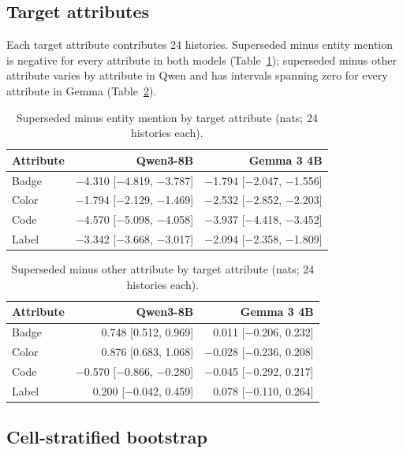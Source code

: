\subsection{Target attributes}

Each target attribute contributes 24 histories. Superseded minus entity mention is negative for every attribute in both models (Table~\ref{tab:b-attr-entity}); superseded minus other attribute varies by attribute in Qwen and has intervals spanning zero for every attribute in Gemma (Table~\ref{tab:b-attr-other}).

\begin{table}[h]
\caption{Superseded minus entity mention by target attribute (nats; 24 histories each).}
\label{tab:b-attr-entity}
\begin{center}
\small
\begin{tabular}{@{}lrr@{}}
\toprule
Attribute & Qwen3-8B & Gemma 3 4B \\
\midrule
Badge & −4.310 [−4.819, −3.787] & −1.794 [−2.047, −1.556] \\
Color & −1.794 [−2.129, −1.469] & −2.532 [−2.852, −2.203] \\
Code & −4.570 [−5.098, −4.058] & −3.937 [−4.418, −3.452] \\
Label & −3.342 [−3.668, −3.017] & −2.094 [−2.358, −1.809] \\
\bottomrule
\end{tabular}
\end{center}
\end{table}

\begin{table}[h]
\caption{Superseded minus other attribute by target attribute (nats; 24 histories each).}
\label{tab:b-attr-other}
\begin{center}
\small
\begin{tabular}{@{}lrr@{}}
\toprule
Attribute & Qwen3-8B & Gemma 3 4B \\
\midrule
Badge & 0.748 [0.512, 0.969] & 0.011 [−0.206, 0.232] \\
Color & 0.876 [0.683, 1.068] & −0.028 [−0.236, 0.208] \\
Code & −0.570 [−0.866, −0.280] & −0.045 [−0.292, 0.217] \\
Label & 0.200 [−0.042, 0.459] & 0.078 [−0.110, 0.264] \\
\bottomrule
\end{tabular}
\end{center}
\end{table}

\subsection{Cell-stratified bootstrap}

